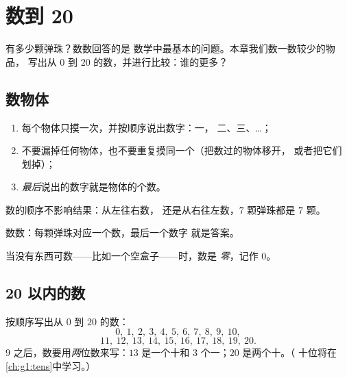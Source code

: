  \chapter{数到 20}\label{ch:g1:counting}

 有多少颗弹珠？数数回答的是
数学中最基本的问题。本章我们数一数较少的物品，
写出从 $0$ 到 $20$ 的数，并进行比较：谁的更多？

 \section{数物体}

 \begin{method}[怎样数数]\label{met:g1:counting:how}
\begin{enumerate}
  \item 每个物体只摸一次，并按顺序说出数字：一，
        二、三、\dots；
  \item 不要漏掉任何物体，也不要重复摸同一个（把数过的物体移开，
        或者把它们划掉）；
  \item \emph{最后}说出的数字就是物体的个数。
\end{enumerate}
数的顺序不影响结果：从左往右数，
还是从右往左数，$7$ 颗弹珠都是 $7$ 颗。
\end{method}

\begin{omfigure}

{\small 数数：每颗弹珠对应一个数，最后一个数字
就是答案。}
\end{omfigure}

\begin{definition}[零]\label{def:g1:counting:zero}
当没有东西可数——比如一个空盒子——时，数是
\emph{零}，记作 $0$。
\end{definition}

 \section{20 以内的数}

\begin{example}[读数与写数]\label{ex:g1:counting:writing}
按顺序写出从 $0$ 到 $20$ 的数：
\[
0,\ 1,\ 2,\ 3,\ 4,\ 5,\ 6,\ 7,\ 8,\ 9,\ 10,
\]
\[
11,\ 12,\ 13,\ 14,\ 15,\ 16,\ 17,\ 18,\ 19,\ 20 .
\]
$9$ 之后，数要用\emph{两}位数来写：$13$ 是一个十和
$3$ 个一；$20$ 是两个十。（
十位将在\cref{ch:g1:tens}中学习。）
\end{example}

